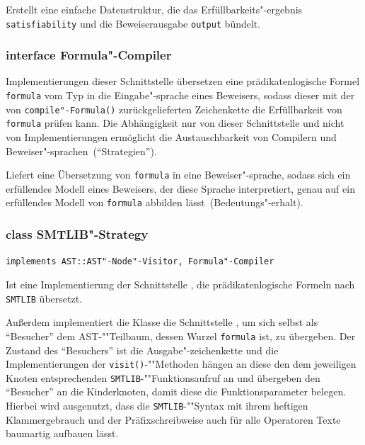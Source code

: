 \begin{description}%

    Erstellt eine einfache Datenstruktur, die das
    Erfüllbarkeits"-ergebnis \texttt{satisfiability} und die
    Beweiserausgabe \texttt{output} bündelt.%

\end{description}%

\subsubsection{interface Formula"-Compiler}%

Implementierungen dieser Schnittstelle übersetzen eine
prädikatenlogische Formel \texttt{formula} vom Typ
 in die Eingabe"-sprache eines Beweisers, sodass
dieser mit der von \texttt{compile"-Formula()} zurückgelieferten
Zeichenkette die Erfüllbarkeit von \texttt{formula} prüfen kann. Die
Abhängigkeit nur von dieser Schnittstelle und nicht von
Implementierungen ermöglicht die Austauschbarkeit von Compilern und
Beweiser"-sprachen~("`Strategien"').%


\begin{description}%

    Liefert eine Übersetzung von \texttt{formula} in eine
    Beweiser"-sprache, sodass sich ein erfüllendes Modell eines Beweisers, der
    diese Sprache interpretiert, genau auf ein erfüllendes Modell von
    \texttt{formula} abbilden lässt~(Bedeutungs"-erhalt).%


\end{description}%

\subsubsection{class SMTLIB"-Strategy}%

\texttt{implements AST::AST"-Node"-Visitor, Formula"-Compiler}%

Ist eine Implementierung der Schnittstelle ,
die prädikatenlogische Formeln nach \texttt{SMTLIB} übersetzt.%

Außerdem implementiert die Klasse die Schnittstelle
, um sich selbst als "`Besucher"' dem
AST-""Teilbaum, dessen Wurzel \texttt{formula} ist, zu übergeben. Der
Zustand des "`Besuchers"' ist die Ausgabe"-zeichenkette und die
Implementierungen der \texttt{visit()}-""Methoden hängen an diese den
dem jeweiligen Knoten entsprechenden \texttt{SMTLIB}-""Funktionsaufruf
an und übergeben den "`Besucher"' an die Kinderknoten, damit diese die
Funktionsparameter belegen. Hierbei wird ausgenutzt, dass die
\texttt{SMTLIB}-""Syntax mit ihrem heftigen Klammergebrauch und der
Präfixschreibweise auch für alle Operatoren Texte baumartig aufbauen
lässt.%

